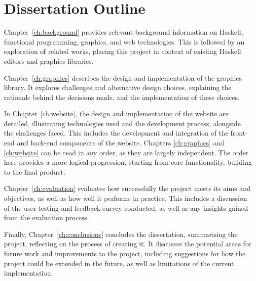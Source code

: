 \documentclass[../main.tex]{subfiles}
\begin{document}
    \section{Dissertation Outline}
        Chapter~\ref{ch:background} provides relevant background information on
            Haskell, functional programming, graphics, and web technologies.
        This is followed by an exploration of related works, placing this project in
            context of existing Haskell editors and graphics libraries.

        Chapter~\ref{ch:graphics} describes the design and implementation of the
            graphics library.
        It explores challenges and alternative design choices, explaining the rationale
            behind the decisions made, and the implementation of these choices.

        In Chapter~\ref{ch:website}, the design and implementation of the website are
            detailed, illustrating technologies used and the development process, alongside
            the challenges faced.
        This includes the development and integration of the front-end and back-end
            components of the website.
        Chapters \ref{ch:graphics} and \ref{ch:website} can be read in any order, as
            they are largely independent.
        The order here provides a more logical progression, starting from core
            functionality, building to the final product.

        Chapter~\ref{ch:evaluation} evaluates how successfully the project meets its
            aims and objectives, as well as how well it performs in practice.
        This includes a discussion of the user testing and feedback survey conducted,
            as well as any insights gained from the evaluation process.

        Finally, Chapter~\ref{ch:conclusions} concludes the dissertation, summarising
            the project, reflecting on the process of creating it.
        It discusses the potential areas for future work and improvements to the
            project, including suggestions for how the project could be extended in the
            future, as well as limitations of the current implementation.
\end{document}
